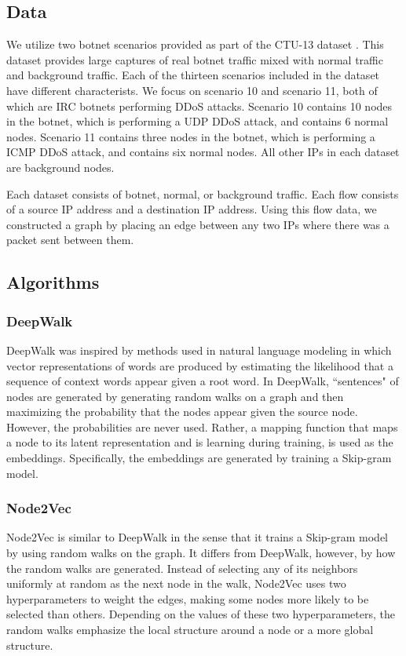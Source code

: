 \documentclass[10pt]{article}
\begin{document}
\begin{multicols}{2}
\subsection{Data}
We utilize two botnet scenarios provided as part of the CTU-13 dataset \cite{Garcia}. This dataset provides large captures of real botnet traffic mixed with normal traffic and background traffic. Each of the thirteen scenarios included in the dataset have different characterists. We focus on scenario 10 and scenario 11, both of which are IRC botnets performing DDoS attacks. Scenario 10 contains 10 nodes in the botnet, which is performing a UDP DDoS attack, and contains 6 normal nodes. Scenario 11 contains three nodes in the botnet, which is performing a ICMP DDoS attack, and contains six normal nodes. All other IPs in each dataset are background nodes. 

Each dataset consists of botnet, normal, or background traffic. Each flow consists of a source IP address and a destination IP address. Using this flow data, we constructed a graph by placing an edge between any two IPs where there was a packet sent between them. 

\subsection{Algorithms}
 \subsubsection{DeepWalk}
DeepWalk \cite{Perozzi} was inspired by methods used in natural language modeling in which vector representations of words are produced by estimating the likelihood that a sequence of context words appear given a root word. In DeepWalk, ``sentences" of nodes are generated by generating random walks on a graph and then maximizing the probability that the nodes appear given the source node. However, the probabilities are never used. Rather, a mapping function that maps a node to its latent representation and is learning during training, is used as the embeddings. Specifically, the embeddings are generated by training a Skip-gram model.

\subsubsection{Node2Vec}
Node2Vec \cite{Grover} is similar to DeepWalk in the sense that it trains a Skip-gram model by using random walks on the graph. It differs from DeepWalk, however, by how the random walks are generated. Instead of selecting any of its neighbors uniformly at random as the next node in the walk, Node2Vec uses two hyperparameters to weight the edges, making some nodes more likely to be selected than others. Depending on the values of these two hyperparameters, the random walks emphasize the local structure around a node or a more global structure. 


\end{multicols}
\end{document}
